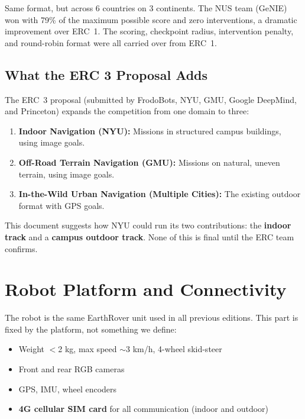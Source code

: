 \documentclass[11pt,a4paper]{article}
\begin{document}
Same format, but across 6 countries on 3 continents. The NUS team (GeNIE) won with 79\% of the maximum possible score and zero interventions, a dramatic improvement over ERC~1. The scoring, checkpoint radius, intervention penalty, and round-robin format were all carried over from ERC~1.

\subsection{What the ERC 3 Proposal Adds}

The ERC~3 proposal (submitted by FrodoBots, NYU, GMU, Google DeepMind, and Princeton) expands the competition from one domain to three:

\begin{enumerate}
    \item \textbf{Indoor Navigation (NYU):} Missions in structured campus buildings, using image goals.
    \item \textbf{Off-Road Terrain Navigation (GMU):} Missions on natural, uneven terrain, using image goals.
    \item \textbf{In-the-Wild Urban Navigation (Multiple Cities):} The existing outdoor format with GPS goals.
\end{enumerate}

This document suggests how NYU could run its two contributions: the \textbf{indoor track} and a \textbf{campus outdoor track}. None of this is final until the ERC team confirms.


\section{Robot Platform and Connectivity}

The robot is the same EarthRover unit used in all previous editions. This part is fixed by the platform, not something we define:

\begin{itemize}[nosep]
    \item Weight $<$2 kg, max speed $\sim$3 km/h, 4-wheel skid-steer
    \item Front and rear RGB cameras
    \item GPS, IMU, wheel encoders
    \item \textbf{4G cellular SIM card} for all communication (indoor and outdoor)
\end{itemize}
\end{document}
